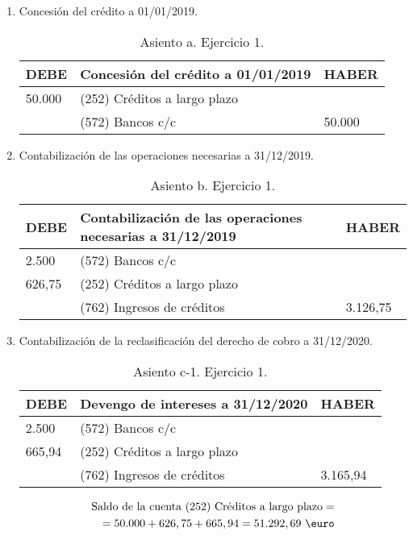 \begin{enumerate}[label=\alph*)]
    \item Concesión del crédito a 01/01/2019.
    
    \begin{table}[H]
        \centering
        \begin{tabular}{|p{3cm}|p{6cm}|p{3cm}|}
        \hline
        \rowcolor{blue!30}
        \textbf{DEBE} & \textbf{Concesión del crédito a 01/01/2019} & \textbf{HABER} \\
        \hline
        50.000 & (252) Créditos a largo plazo & \\
        \hline
        & (572) Bancos c/c & 50.000 \\
        \hline
        \end{tabular}
        \caption{Asiento a. Ejercicio 1.}
        \label{tabla:asiento1ej1T2}
    \end{table}

    \item Contabilización de las operaciones necesarias a 31/12/2019.
    
    \begin{table}[H]
        \centering
        \begin{tabular}{|p{3cm}|p{6cm}|p{3cm}|}
        \hline
        \rowcolor{blue!30}
        \textbf{DEBE} & \textbf{Contabilización de las operaciones necesarias a 31/12/2019} & \textbf{HABER} \\
        \hline
        2.500 & (572) Bancos c/c & \\
        \hline
        626,75 & (252) Créditos a largo plazo & \\
        \hline
        & (762) Ingresos de créditos & 3.126,75 \\
        \hline
        \end{tabular}
        \caption{Asiento b. Ejercicio 1.}
        \label{tabla:asiento2ej1T2}
    \end{table}


    \item Contabilización de la reclasificación del derecho de cobro a 31/12/2020.
    \begin{table}[H]
        \centering
        \begin{tabular}{|p{3cm}|p{6cm}|p{3cm}|}
        \hline
        \rowcolor{blue!30}
        \textbf{DEBE} & \textbf{Devengo de intereses a 31/12/2020} & \textbf{HABER} \\
        \hline
        2.500 & (572) Bancos c/c & \\
        \hline
        665,94 & (252) Créditos a largo plazo & \\
        \hline
        & (762) Ingresos de créditos & 3.165,94 \\
        \hline
        \end{tabular}
        \caption{Asiento c-1. Ejercicio 1.}
        \label{tabla:asiento3ej1T2}
    \end{table}
    \begin{align*}
        \text{Saldo de la cuenta (252) Créditos a largo plazo} = \\ = 50.000 + 626,75 + 665,94 = 51.292,69 \text{ \euro}
    \end{align*}


\end{enumerate}
